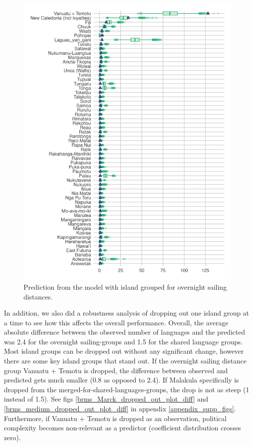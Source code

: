 \documentclass[a4paper,10pt]{article} %
\begin{document}
\begin{figure}[ht]
\centering
\includegraphics[width=\textwidth]{brms_predict_Marck.png}
\caption{Prediction from the model with island grouped for overnight sailing distances.}
\label{Marck_model_predict}
\end{figure}

In addition, we also did a robustness analysis of dropping out one island group at a time to see how this affects the overall performance. Overall, the average absolute difference between the observed number of languages and the predicted was 2.4 for the overnight sailing-groups and 1.5 for the shared language groups. Most island groups can be dropped out without any significant change, however there are some key island groups that stand out. If the overnight sailing distance group Vanuatu + Temotu is dropped, the difference between observed and predicted gets much smaller (0.8 as opposed to 2.4). If Malakula specifically is dropped from the merged-for-shared-languages-groups, the drop is not as steep (1 instead of 1.5). See figs \ref{brms_Marck_dropped_out_plot_diff} and \ref{brms_medium_dropped_out_plot_diff} in appendix \ref{appendix_supp_figs}. Furthermore, if Vanuatu + Temotu is dropped as an observation, political complexity becomes non-relevant as a predictor (coefficient distribution crosses zero).
\end{document}
